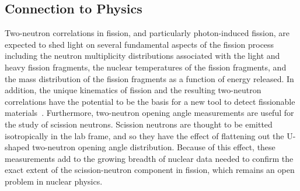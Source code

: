 \subsection{Connection to Physics}
Two-neutron correlations in fission, and particularly photon-induced fission, are expected to shed light on several fundamental aspects of the fission process including the neutron multiplicity distributions associated with the light and heavy fission fragments, the nuclear temperatures of the fission fragments, and the mass distribution of the fission fragments as a function of energy released.
In addition, the unique kinematics of fission and the resulting two-neutron correlations have the potential to be the basis for a new tool to detect fissionable materials~\cite{Talou2018}.
Furthermore, two-neutron opening angle measurements are useful for the study of scission neutrons.
Scission neutrons are thought to be emitted isotropically in the lab frame, and so they have the effect of flattening out the U-shaped two-neutron opening angle distribution.
Because of this effect, these measurements add to the growing breadth of nuclear data needed to confirm the exact extent of the scission-neutron component in fission, which remains an open problem in nuclear physics.

